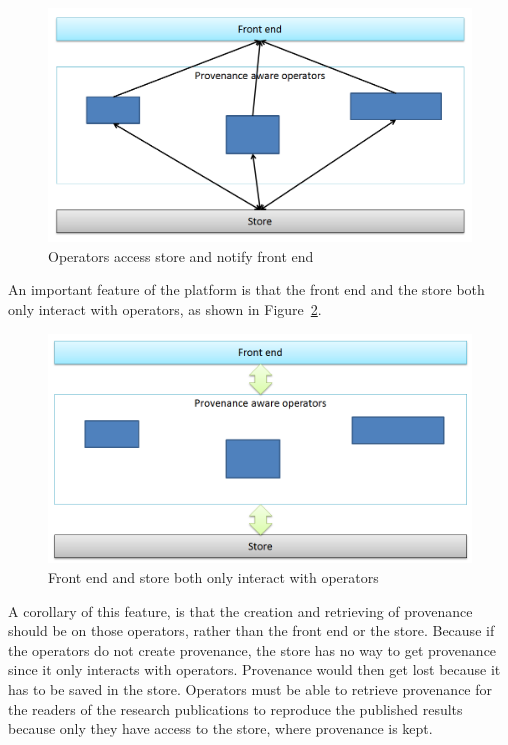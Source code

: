 \begin{figure}
	\centering
	\includegraphics[width=\textwidth]{execute.png}
	\caption{Operators access store and notify front end}
	\label{fig:execute}
\end{figure}
An important feature of the platform is that the front end and the store both only interact with operators, as shown in Figure~\ref{fig:platform}.
\begin{figure}
	\centering
	\includegraphics[width=\textwidth]{platform.png}
	\caption{Front end and store both only interact with operators}
	\label{fig:platform}
\end{figure}
A corollary of this feature, is that the creation and retrieving of provenance should be on those operators, rather than the front end or the store. Because if the operators do not create provenance, the store has no way to get provenance since it only interacts with operators. Provenance would then get lost because it has to be saved in the store. Operators must be able to retrieve provenance for the readers of the research publications to reproduce the published results because only they have access to the store, where provenance is kept.

